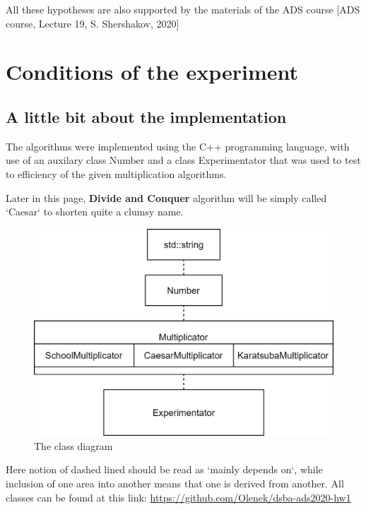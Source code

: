 \documentclass[12pt, oneside]{article}
\begin{document}
All these hypotheses are also supported by the materials of the ADS course [ADS course, Lecture 19, S. Shershakov, 2020]

\section{Conditions of the experiment}
\subsection{A little bit about the implementation}
 The algorithms were implemented using the C++ programming language, with use of an auxilary class Number and a class Experimentator that was used to test to efficiency of the given multiplication algorithms. 
 
 Later in this page, \textbf{Divide and Conquer} algorithm will be simply called `Caesar` to shorten quite a clumsy name.
 

  \begin{figure}[h]
\caption{The class diagram}
\centering
\includegraphics[width=1\textwidth]{Class Diagram}
\end{figure}
 Here notion of dashed lined should be read as `mainly depends on`, while inclusion of one area into another means that one is derived from another.
 All classes can be found at this link: 
 \underline{https://github.com/Olenek/dsba-ads2020-hw1}  
 
\end{document}
